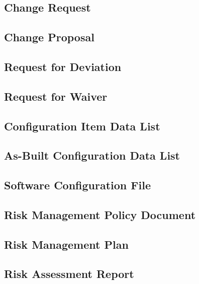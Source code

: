 \subsection{Change Request}
\label{sec:Change Request}


\subsection{Change Proposal}
\label{sec:Change Proposal}


\subsection{Request for Deviation}
\label{sec:Request for Deviation}


\subsection{Request for Waiver}
\label{sec:Request for Waiver}


\subsection{Configuration Item Data List}
\label{sec:Configuration Item Data List}


\subsection{As-Built Configuration Data List}
\label{sec:As-Built Configuration Data List}


\subsection{Software Configuration File}
\label{sec:Software Configuration File}


\subsection{Risk Management Policy Document}
\label{sec:Risk Management Policy Document}


\subsection{Risk Management Plan}
\label{sec:Risk Management Plan}


\subsection{Risk Assessment Report}
\label{sec:Risk Assessment Report}


